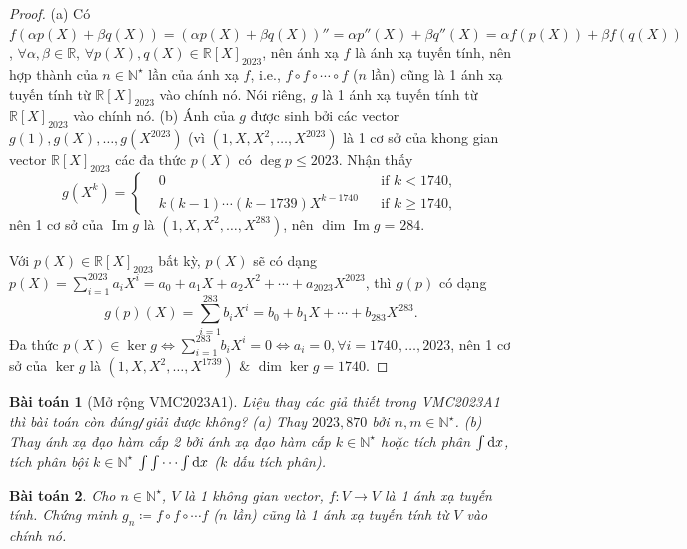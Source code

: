 \documentclass{article}
\newtheorem{baitoan}{Bài toán}
\begin{document}
\begin{proof}
	(a) Có $f(\alpha p(X) + \beta q(X)) = (\alpha p(X) + \beta q(X))'' = \alpha p''(X) + \beta q''(X) = \alpha f(p(X)) + \beta f(q(X))$, $\forall\alpha,\beta\in\mathbb{R}$, $\forall p(X),q(X)\in\mathbb{R}[X]_{2023}$, nên ánh xạ $f$ là ánh xạ tuyến tính, nên hợp thành của $n\in\mathbb{N}^\star$ lần của ánh xạ $f$, i.e., $f\circ f\circ\cdots\circ f$ ($n$ lần) cũng là 1 ánh xạ tuyến tính từ $\mathbb{R}[X]_{2023}$ vào chính nó. Nói riêng, $g$ là 1 ánh xạ tuyến tính từ $\mathbb{R}[X]_{2023}$ vào chính nó. (b) Ánh của $g$ được sinh bởi các vector $g(1),g(X),\ldots,g(X^{2023})$ (vì $(1,X,X^2,\ldots,X^{2023})$ là 1 cơ sở của khong gian vector $\mathbb{R}[X]_{2023}$ các đa thức $p(X)$ có $\deg p\le2023$. Nhận thấy
	\begin{equation*}
		g(X^k) = \left\{\begin{split}
			&0&&\mbox{if } k < 1740,\\
			&k(k - 1)\cdots(k - 1739)X^{k - 1740}&&\mbox{if } k\ge1740,
		\end{split}\right.
	\end{equation*}
	nên 1 cơ sở của $\operatorname{Im}g$ là $(1,X,X^2,\ldots,X^{283})$, nên $\dim\operatorname{Im}g = 284$.
	
	Với $p(X)\in\mathbb{R}[X]_{2023}$ bất kỳ, $p(X)$ sẽ có dạng $p(X) = \sum_{i=1}^{2023} a_iX^i = a_0 + a_1X + a_2X^2 + \cdots + a_{2023}X^{2023}$, thì $g(p)$ có dạng
	\begin{equation*}
		g(p)(X) = \sum_{i=1}^{283} b_iX^i = b_0 + b_1X + \cdots + b_{283}X^{283}.
	\end{equation*}
	Đa thức $p(X)\in\operatorname{ker}g\Leftrightarrow \sum_{i=1}^{283} b_iX^i = 0\Leftrightarrow a_i = 0,\forall i = 1740,\ldots,2023$, nên 1 cơ sở của $\operatorname{ker}g$ là $(1,X,X^2,\ldots,X^{1739})$ \& $\dim\operatorname{ker}g = 1740$.
\end{proof}

\begin{baitoan}[Mở rộng VMC2023A1]
	Liệu thay các giả thiết trong VMC2023A1 thì bài toán còn đúng{\tt/}giải được không? (a) Thay $2023,870$ bởi $n,m\in\mathbb{N}^\star$. (b) Thay ánh xạ đạo hàm cấp 2 bởi ánh xạ đạo hàm cấp $k\in\mathbb{N}^\star$ hoặc tích phân $\int {\rm d}x$, tích phân bội $k\in\mathbb{N}^\star$ $\int\int\cdots\int {\rm d}x$ ($k$ dấu tích phân).
\end{baitoan}

\begin{baitoan}
	Cho $n\in\mathbb{N}^\star$, $V$ là 1 không gian vector, $f:V\to V$ là 1 ánh xạ tuyến tính. Chứng minh $g_n\coloneqq f\circ f\circ\cdots f$ ($n$ lần) cũng là 1 ánh xạ tuyến tính từ $V$ vào chính nó.
\end{baitoan}
\end{document}
